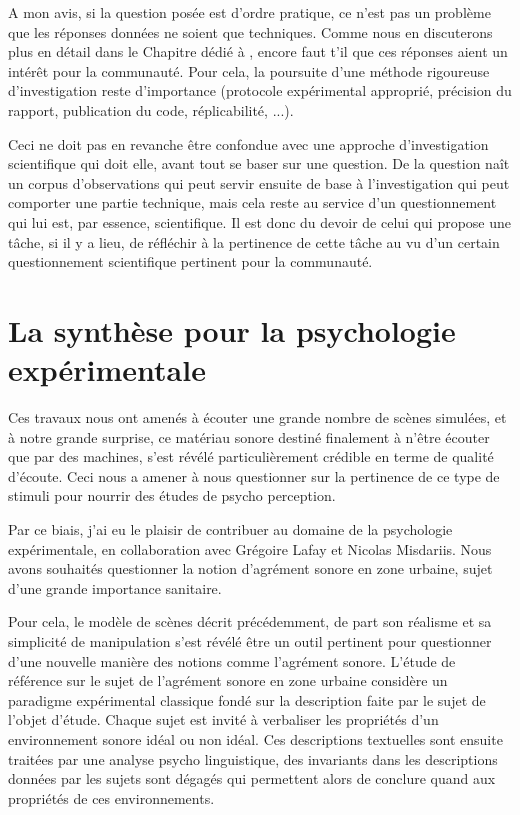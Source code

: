   A mon avis, si la question posée est d'ordre pratique, ce n'est pas un problème que les réponses données ne soient que techniques. Comme nous en discuterons plus en détail dans le Chapitre dédié à , encore faut t'il que ces réponses aient un intérêt pour la communauté. Pour cela, la poursuite d'une méthode rigoureuse d'investigation reste d'importance (protocole expérimental approprié, précision du rapport, publication du code, réplicabilité, ...).

  Ceci ne doit pas en revanche être confondue avec une approche d'investigation scientifique qui doit elle, avant tout se baser sur une question. De la question naît un corpus d'observations qui peut servir ensuite de base à l'investigation qui peut comporter une partie technique, mais cela reste au service d'un questionnement qui lui est, par essence, scientifique. Il est donc du devoir de celui qui propose une tâche, si il y a lieu, de réfléchir à la pertinence de cette tâche au vu d'un certain questionnement scientifique pertinent pour la communauté.

  \section{ \nmu La  synthèse pour la psychologie expérimentale} \label{sec:psycho}

  Ces travaux nous ont amenés à écouter une grande nombre de scènes simulées, et à notre grande surprise, ce matériau sonore destiné finalement à n'être écouter que par des machines, s'est révélé particulièrement crédible en terme de qualité d'écoute. Ceci nous a amener à nous questionner sur la pertinence de ce type de stimuli pour nourrir des études de psycho perception.

  Par ce biais, j'ai eu le plaisir de contribuer au domaine de la psychologie expérimentale, en collaboration avec Grégoire Lafay et Nicolas Misdariis. Nous avons souhaités questionner la notion d'agrément sonore en zone urbaine, sujet d'une grande importance sanitaire.

  Pour cela, le modèle de scènes décrit précédemment, de part son réalisme et sa simplicité de manipulation s'est révélé être un outil pertinent pour questionner d'une nouvelle manière des notions comme l'agrément sonore. L'étude de référence sur le sujet de l'agrément sonore en zone urbaine\cite{guastavino2006ideal} considère un paradigme expérimental classique fondé sur la description faite par le sujet de l'objet d'étude. Chaque sujet est invité à verbaliser les propriétés d'un environnement sonore idéal ou non idéal. Ces descriptions textuelles sont ensuite traitées par une analyse psycho linguistique, des invariants dans les descriptions données par les sujets sont dégagés qui permettent alors de conclure quand aux propriétés de ces environnements.

